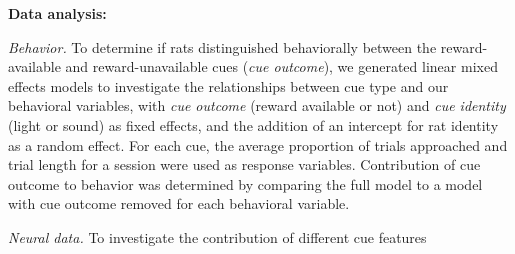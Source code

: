 \documentclass[11pt]{article}
\begin{document}
{\bf Data analysis:}

{\it Behavior.} To determine if rats distinguished behaviorally between the
reward-available and reward-unavailable cues ({\it cue outcome}), we generated
linear mixed effects models to investigate the relationships between cue type
and our behavioral variables, with {\it cue outcome} (reward available or not)
and {\it cue identity} (light or sound) as fixed effects, and the addition of an
intercept for rat identity as a random effect. For each cue, the average
proportion of trials approached and trial length for a session were used as
response variables. Contribution of cue outcome to behavior was determined by
comparing the full model to a model with cue outcome removed for each behavioral
variable.

{\it Neural data.} To investigate the contribution of different cue features
\end{document}

